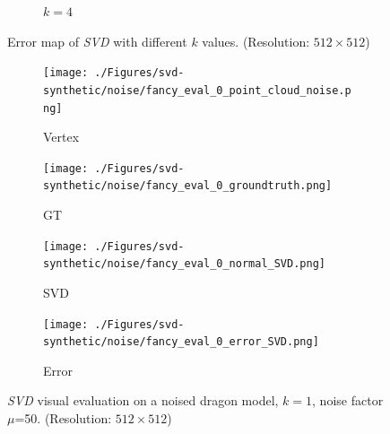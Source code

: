 \begin{figure}[th]
\begin{subfigure}[b]{0.24\linewidth}
	\caption{$ k=4 $}
\end{subfigure}
	\decoRule
	\caption{Error map of \textit{SVD} with different $ k $ values. (Resolution: $ 512\times 512 $) }
	\label{fig:svd-k-eval}
\end{figure}



\begin{figure}[H]
	\centering
	\captionsetup{width=\linewidth}
	\begin{subfigure}[b]{0.24\linewidth}
		\texttt{[image: ./Figures/svd-synthetic/noise/fancy\_eval\_0\_point\_cloud\_noise.png]}
		\caption{Vertex}
	\end{subfigure}
	\begin{subfigure}[b]{0.24\linewidth}
		\texttt{[image: ./Figures/svd-synthetic/noise/fancy\_eval\_0\_groundtruth.png]}
		\caption{GT}
	\end{subfigure}
	\begin{subfigure}[b]{0.24\linewidth}
		\texttt{[image: ./Figures/svd-synthetic/noise/fancy\_eval\_0\_normal\_SVD.png]}
		\caption{SVD}
	\end{subfigure}
	\begin{subfigure}[b]{0.24\linewidth}
		\texttt{[image: ./Figures/svd-synthetic/noise/fancy\_eval\_0\_error\_SVD.png]}
		\caption{Error}
	\end{subfigure}
	\decoRule
	\caption{\textit{SVD} visual evaluation on a noised dragon model, $ k=1 $, noise factor $ \mu $=50. (Resolution: $ 512\times 512 $) }
	\label{fig:svd-noise}
\end{figure}

